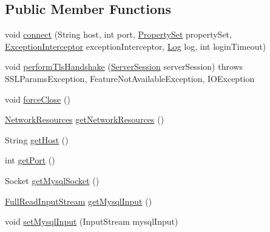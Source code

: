 \subsection*{Public Member Functions}
\begin{DoxyCompactItemize}
\item 
void \mbox{\hyperlink{interfacecom_1_1mysql_1_1cj_1_1protocol_1_1_socket_connection_ac20aea608e999684c82a0dbaaa5886c7}{connect}} (String host, int port, \mbox{\hyperlink{interfacecom_1_1mysql_1_1cj_1_1conf_1_1_property_set}{Property\+Set}} property\+Set, \mbox{\hyperlink{interfacecom_1_1mysql_1_1cj_1_1exceptions_1_1_exception_interceptor}{Exception\+Interceptor}} exception\+Interceptor, \mbox{\hyperlink{interfacecom_1_1mysql_1_1cj_1_1log_1_1_log}{Log}} log, int login\+Timeout)
\item 
void \mbox{\hyperlink{interfacecom_1_1mysql_1_1cj_1_1protocol_1_1_socket_connection_a15064c0de5e729be5f27a42aee58fdd5}{perform\+Tls\+Handshake}} (\mbox{\hyperlink{interfacecom_1_1mysql_1_1cj_1_1protocol_1_1_server_session}{Server\+Session}} server\+Session)  throws S\+S\+L\+Params\+Exception, Feature\+Not\+Available\+Exception, I\+O\+Exception
\item 
void \mbox{\hyperlink{interfacecom_1_1mysql_1_1cj_1_1protocol_1_1_socket_connection_abca5f1289b335c1f44ac09ee1052a179}{force\+Close}} ()
\item 
\mbox{\hyperlink{classcom_1_1mysql_1_1cj_1_1protocol_1_1_network_resources}{Network\+Resources}} \mbox{\hyperlink{interfacecom_1_1mysql_1_1cj_1_1protocol_1_1_socket_connection_aaf05ea68f2fb6c8c192ee8ec8f8faf91}{get\+Network\+Resources}} ()
\item 
String \mbox{\hyperlink{interfacecom_1_1mysql_1_1cj_1_1protocol_1_1_socket_connection_a1fa2cc5cddf0b92a9f19472924aa6e61}{get\+Host}} ()
\item 
int \mbox{\hyperlink{interfacecom_1_1mysql_1_1cj_1_1protocol_1_1_socket_connection_afb84b242933a9707222f246fd64dffb1}{get\+Port}} ()
\item 
Socket \mbox{\hyperlink{interfacecom_1_1mysql_1_1cj_1_1protocol_1_1_socket_connection_a121c70b73c6aed15d44533af8194ba8c}{get\+Mysql\+Socket}} ()
\item 
\mbox{\hyperlink{classcom_1_1mysql_1_1cj_1_1protocol_1_1_full_read_input_stream}{Full\+Read\+Input\+Stream}} \mbox{\hyperlink{interfacecom_1_1mysql_1_1cj_1_1protocol_1_1_socket_connection_acf79ea4de0d3d0054db3ae5446f0319c}{get\+Mysql\+Input}} ()
\item 
void \mbox{\hyperlink{interfacecom_1_1mysql_1_1cj_1_1protocol_1_1_socket_connection_a0b307f24afb5f5e1090f2b2f99f13cf5}{set\+Mysql\+Input}} (Input\+Stream mysql\+Input)

\end{DoxyCompactItemize}
